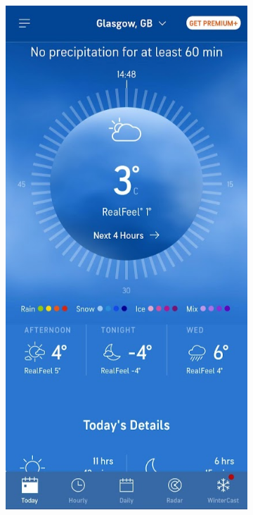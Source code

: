 \documentclass{l4proj}
\begin{document}
\begin{figure}[htb!] 
    \centering
    \begin{subfigure}[b]{0.4\textwidth}
        \includegraphics[width=\textwidth]{images/Accu_day.jpg}

\end{subfigure}
\end{figure}
\end{document}
